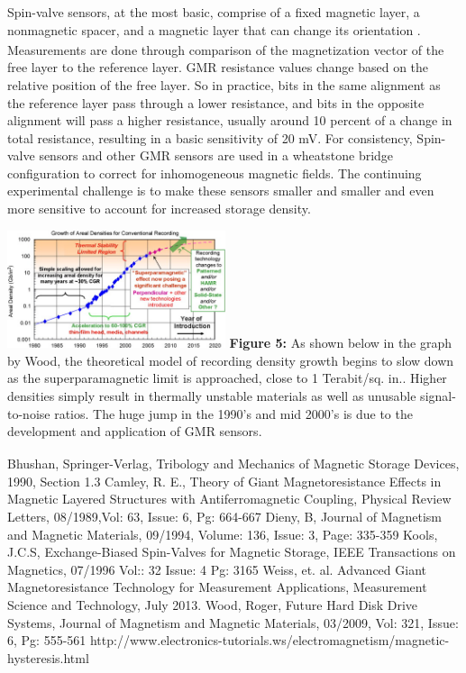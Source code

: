 \documentclass[11pt]{article}
\begin{document}
\begin{multicols}{2}
Spin-valve sensors, at the most basic, comprise of a fixed magnetic layer, a nonmagnetic spacer, and a magnetic layer that can change its orientation\textsubscript{ \cite{label3}}. Measurements  are done through comparison of the magnetization vector of the free layer to the reference layer. GMR resistance values change based on the relative position of the free layer. So in practice, bits in the same alignment as the reference layer pass through a lower resistance, and bits in the opposite alignment will pass a higher resistance, usually around 10 percent of a change in total resistance, resulting in a basic sensitivity of 20 mV. For consistency, Spin-valve sensors and other GMR sensors are used in a wheatstone bridge configuration to correct for inhomogeneous magnetic fields. The continuing experimental challenge is to make these sensors smaller and smaller and even more sensitive to account for increased storage density.

\begin{center}
	\centering
	\includegraphics[width=0.48\textwidth]{region_of_stability.png}
	{\footnotesize\textbf{Figure 5:} As shown below in the graph by Wood, the theoretical model of recording density growth begins to slow down as the superparamagnetic limit is approached, close to 1 Terabit/sq. in.. Higher densities simply result in thermally unstable materials as well as unusable signal-to-noise ratios. The huge jump in the 1990’s and mid 2000’s is due to the development and application of GMR sensors.\textsubscript{\cite{label6}}} 
\end{center} 



\begin{thebibliography}{9}
	{\footnotesize
	 Bhushan, Springer-Verlag, Tribology and Mechanics of Magnetic Storage Devices, 1990, Section 1.3 
	 Camley, R. E., Theory of Giant Magnetoresistance Effects in Magnetic Layered Structures with Antiferromagnetic Coupling, Physical Review Letters, 08/1989,Vol: 63, Issue: 6, Pg: 664-667
	 Dieny, B, Journal of Magnetism and Magnetic Materials, 09/1994, Volume: 136, Issue: 3, Page: 335-359
	 Kools, J.C.S, Exchange-Biased Spin-Valves for Magnetic Storage, IEEE Transactions on Magnetics, 07/1996 Vol:: 32 Issue: 4 Pg: 3165
	Weiss, et. al. Advanced Giant Magnetoresistance Technology for Measurement Applications, Measurement Science and Technology, July 2013.  
	 Wood, Roger, Future Hard Disk Drive Systems, Journal of Magnetism and Magnetic Materials, 03/2009, Vol: 321, Issue: 6, Pg: 555-561
	 http://www.electronics-tutorials.ws/electromagnetism/magnetic-hysteresis.html
	
}
\end{thebibliography}
\end{multicols}
\end{document}
